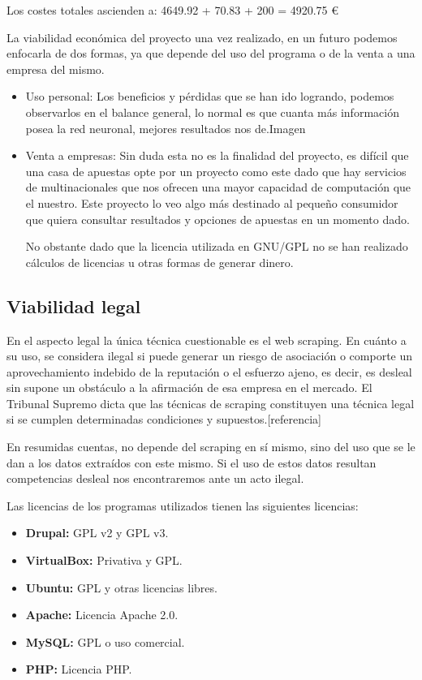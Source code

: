 Los costes totales ascienden a:
4649.92 + 70.83 + 200 = 4920.75 \euro{}

La viabilidad económica del proyecto una vez realizado, en un futuro podemos enfocarla de dos formas, ya que depende del uso del programa o de la venta a una empresa del mismo.
\begin{itemize}
\item Uso personal: Los beneficios y pérdidas que se han ido logrando, podemos observarlos en el balance general, lo normal es que cuanta más información posea la red neuronal, mejores resultados nos de.{Imagen}

\item Venta a empresas: Sin duda esta no es la finalidad del proyecto, es difícil que una casa de apuestas opte por un proyecto como este dado que hay servicios de multinacionales que nos ofrecen una mayor capacidad de computación que el nuestro. Este proyecto lo veo algo más destinado al pequeño consumidor que quiera consultar resultados y opciones de apuestas en un momento dado.

No obstante dado que la licencia utilizada en GNU/GPL no se han realizado cálculos de licencias u otras formas de generar dinero.
\end{itemize}

\subsection{Viabilidad legal}
En el aspecto legal la única técnica cuestionable es el web scraping. En cuánto a su uso, se considera ilegal si puede generar un riesgo de asociación o comporte un aprovechamiento indebido de la reputación o el esfuerzo ajeno, es decir, es desleal sin supone un obstáculo a la afirmación de esa empresa en el mercado. El Tribunal Supremo dicta que las técnicas de scraping constituyen una técnica legal si se cumplen determinadas condiciones y supuestos.[referencia]

En resumidas cuentas, no depende del scraping en sí mismo, sino del uso que se le dan a los datos extraídos con este mismo. Si el uso de estos datos resultan competencias desleal nos encontraremos ante un acto ilegal.

Las licencias de los programas utilizados tienen las siguientes licencias:
\begin{itemize}
\item \textbf{Drupal: } GPL v2 y GPL v3.
\item \textbf{VirtualBox: } Privativa y GPL.
\item \textbf{Ubuntu: } GPL y otras licencias libres.
\item \textbf{Apache: } Licencia Apache 2.0.
\item \textbf{MySQL: } GPL o uso comercial.
\item \textbf{PHP: } Licencia PHP.
\end{itemize}

